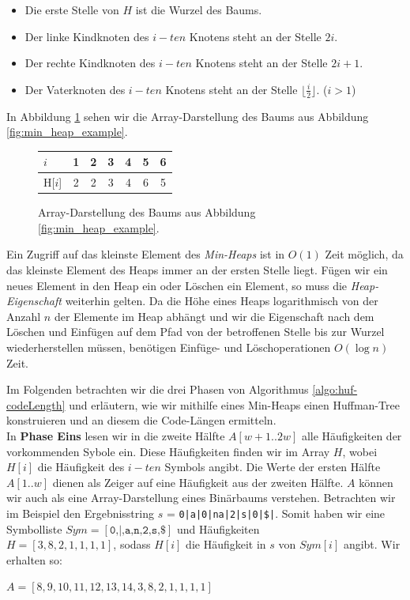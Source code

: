 \documentclass[a4paper,11pt]{scrartcl}%
\theoremstyle{change}
\theoremstyle{nonumberplain}
\theoremstyle{change}
\theoremstyle{nonumberplain}
\theoremstyle{change}
\theoremstyle{nonumberplain}
\begin{document}
\begin{itemize}
	\item Die erste Stelle von $H$ ist die Wurzel des Baums. \label{heap_array_prop_1}
	\item Der linke Kindknoten des $i-ten$ Knotens steht an der Stelle $2i$.
	\item Der rechte Kindknoten des $i-ten$ Knotens steht an der Stelle $2i + 1$.
	\item Der Vaterknoten des $i-ten$ Knotens steht an der Stelle $\lfloor\frac{i}{2}\rfloor$. ($i>1$)
\end{itemize}
	
In Abbildung \ref{fig:array_heap} sehen wir die Array-Darstellung des Baums aus Abbildung \ref{fig:min_heap_example}.

\begin{figure}[h]
	\centering
	
		\begin{tabular}[h]{|l|c|c|c|c|c|c|}\hline
			$i$ & 1 & 2 & 3 & 4 & 5 & 6\\ \hline
		   H[$i$] & 2 & 2 & 3 & 4 & 6 & 5\\ \hline
		   
		\end{tabular} 
		\caption{Array-Darstellung des Baums aus Abbildung \ref{fig:min_heap_example}.}
		\label{fig:array_heap}
\end{figure}

Ein Zugriff auf das kleinste Element des \textit{Min-Heaps} ist in $O(1)$ Zeit möglich, da das kleinste Element des Heaps immer an der ersten Stelle liegt.
Fügen wir ein neues Element in den Heap ein oder Löschen ein Element, so muss die \textit{Heap-Eigenschaft} weiterhin gelten. Da die Höhe eines Heaps logarithmisch von der Anzahl $n$ der Elemente im Heap abhängt und wir die Eigenschaft nach dem Löschen und Einfügen auf dem Pfad von der betroffenen Stelle bis zur Wurzel wiederherstellen müssen, benötigen Einfüge- und Löschoperationen $O(\log n)$ Zeit. \cite[S.115ff]{introductionToAlgorithms}
\vspace{40px}

Im Folgenden betrachten wir die drei Phasen von Algorithmus \ref{algo:huf-codeLength} und erläutern, wie wir mithilfe eines Min-Heaps einen Huffman-Tree konstruieren und an diesem die Code-Längen ermitteln. \\
In \textbf{Phase Eins} lesen wir in die zweite Hälfte $A[w+1..2w]$ alle Häufigkeiten der vorkommenden Sybole ein. Diese Häufigkeiten finden wir im Array $H$, wobei $H[i]$ die Häufigkeit des $i-ten$ Symbols angibt. Die Werte der ersten Hälfte $A[1..w]$ dienen als Zeiger auf eine Häufigkeit aus der zweiten Hälfte. $A$ können wir auch als eine Array-Darstellung eines Binärbaums verstehen. Betrachten wir im Beispiel den Ergebnisstring $s$ = \texttt{0|a|0|na|2|s|0|\$|}. Somit haben wir eine Symbolliste $Sym = [\texttt{0,|,a,n,2,s,\$}]$ und Häufigkeiten \\$H =[3,8,2,1,1,1,1] $, sodass $H[i]$ die Häufigkeit in $s$ von $Sym[i]$ angibt. Wir erhalten so:
\begin{center}
	$A = [8,9,10,11,12,13,14,3,8,2,1,1,1,1]$
\end{center}
\end{document}
